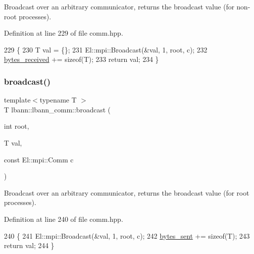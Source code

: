 Broadcast over an arbitrary communicator, returns the broadcast value (for non-\/root processes). 

Definition at line 229 of file comm.\+hpp.


\begin{DoxyCode}
229                                            \{
230     T val = \{\};
231     El::mpi::Broadcast(&val, 1, root, c);
232     \hyperlink{classlbann_1_1lbann__comm_afb99f57f7eafc0695bf28e6c26a8120f}{bytes\_received} += \textcolor{keyword}{sizeof}(T);
233     \textcolor{keywordflow}{return} val;
234   \}
\end{DoxyCode}
\mbox{\label{classlbann_1_1lbann__comm_a34bb0766e57fda27e6618c9e66fec269}} 
\subsubsection{\texorpdfstring{broadcast()}{broadcast()}\hspace{0.1cm}{\footnotesize\ttfamily [2/2]}}
{\footnotesize\ttfamily template$<$typename T $>$ \\
T lbann\+::lbann\+\_\+comm\+::broadcast (\begin{DoxyParamCaption}\item[{int}]{root,  }\item[{T}]{val,  }\item[{const El\+::mpi\+::\+Comm}]{c }\end{DoxyParamCaption})\hspace{0.3cm}{\ttfamily [inline]}}

Broadcast over an arbitrary communicator, returns the broadcast value (for root processes). 

Definition at line 240 of file comm.\+hpp.


\begin{DoxyCode}
240                                                   \{
241     El::mpi::Broadcast(&val, 1, root, c);
242     \hyperlink{classlbann_1_1lbann__comm_ad1f146ae7337ece6266fd307944928e0}{bytes\_sent} += \textcolor{keyword}{sizeof}(T);
243     \textcolor{keywordflow}{return} val;
244   \}
\end{DoxyCode}
\mbox{\label{classlbann_1_1lbann__comm_aa784298e6ed0f9f01a20b179d5110df9}} 

